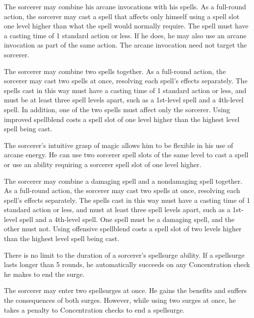  The sorcerer may combine his arcane invocations with his spells. As a full-round action, the sorcerer may cast a spell that affects only himself using a spell slot one level higher than what the spell would normally require. The spell must have a casting time of 1 standard action or less. If he does, he may also use an arcane invocation as part of the same action. The arcane invocation need not target the sorcerer.

 The sorcerer may combine two spells together. As a full-round action, the sorcerer may cast two spells at once, resolving each spell's effects separately. The spells cast in this way must have a casting time of 1 standard action or less, and must be at least three spell levels apart, such as a 1st-level spell and a 4th-level spell. In addition, one of the two spells must affect only the sorcerer. Using improved spellblend costs a spell slot of one level higher than the highest level spell being cast.

 The sorcerer's intuitive grasp of magic allows him to be flexible in his use of arcane energy. He can use two sorcerer spell slots of the same level to cast a spell or use an ability requiring a sorcerer spell slot of one level higher.

 The sorcerer may combine a damaging spell and a nondamaging spell together. As a full-round action, the sorcerer may cast two spells at once, resolving each spell's effects separately. The spells cast in this way must have a casting time of 1 standard action or less, and must at least three spell levels apart, such as a 1st-level spell and a 4th-level spell. One spell must be a damaging spell, and the other must not. Using offensive spellblend costs a spell slot of two levels higher than the highest level spell being cast.

 There is no limit to the duration of a sorcerer's spellsurge ability. If a spellsurge lasts longer than 5 rounds, he automatically succeeds on any Concentration check he makes to end the surge.

 The sorcerer may enter two spellsurges at once. He gains the benefits and suffers the consequences of both surges. However, while using two surges at once, he takes a  penalty to Concentration checks to end a spellsurge.

